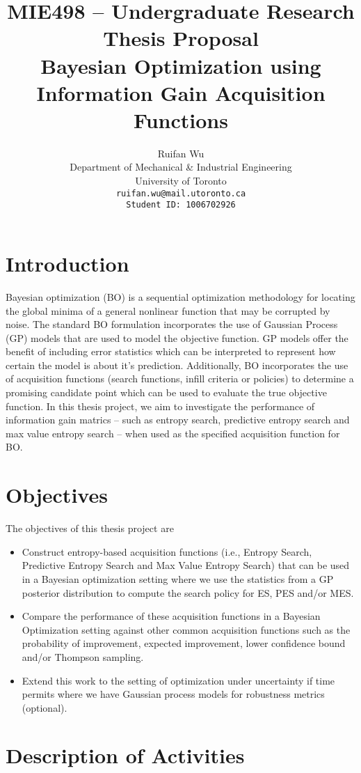 \documentclass{article}
\title{
MIE498 -- Undergraduate Research Thesis Proposal \\
Bayesian Optimization using Information Gain Acquisition Functions
}
\author{
  Ruifan Wu \\
  Department of Mechanical \& Industrial Engineering\\
  University of Toronto\\
  \texttt{ruifan.wu@mail.utoronto.ca} \\
  \texttt{Student ID: 1006702926}
}
\begin{document}
\maketitle

\section{Introduction}
Bayesian optimization (BO) is a sequential optimization methodology for locating the global minima of a general nonlinear function that may be corrupted by noise.
The standard BO formulation incorporates the use of Gaussian Process (GP) models that are used to model the objective function.
GP models offer the benefit of including error statistics which can be interpreted to represent how certain the model is about it's prediction.
Additionally, BO incorporates the use of acquisition functions (search functions, infill criteria or policies) to determine a promising candidate point which can be used to evaluate the true objective function.
In this thesis project, we aim to investigate the performance of information gain matrics -- such as entropy search, predictive entropy search and max value entropy search -- when used as the specified acquisition function for BO.


\section{Objectives}
The objectives of this thesis project are

\begin{itemize}
    \item Construct entropy-based acquisition functions (i.e., Entropy Search, Predictive Entropy Search and Max Value Entropy Search) that can be used in a Bayesian optimization setting where we use the statistics from a GP posterior distribution to compute the search policy for ES, PES and/or MES.
    \item Compare the performance of these acquisition functions in a Bayesian Optimization setting against other common acquisition functions such as the probability of improvement, expected improvement, lower confidence bound and/or Thompson sampling.
    \item Extend this work to the setting of optimization under uncertainty if time permits where we have Gaussian process models for robustness metrics (optional).
\end{itemize}

\section{Description of Activities}
\end{document}
